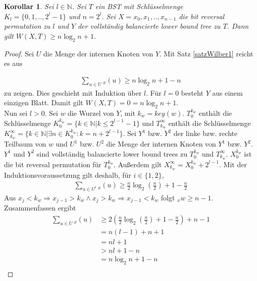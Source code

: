 \documentclass[a4paper,12pt]{article}
\begin{document}
\newtheorem{Korollar1}{Korollar}[section]
\begin{Korollar1} Sei $l \in \mathbb{N}$. Sei $T$ ein BST mit Schlüsselmenge\\ ${K_l = \{0,1,..,2^l -1\}}$ und $n = 2^l$. Sei $X = x_0, x_1,..,x_{n-1}$ die bit reversal permutation zu $l$ und $Y$ der vollständig balancierte lower bound tree zu $T$. Dann gilt  $W\left(X,T\right) \geq n \log_2 n + 1 $. 
\end{Korollar1}
\begin{proof}
Sei $U$ die Menge der internen Knoten von $Y$. Mit Satz \ref{satzWilber1} reicht es aus 

\begin{align*}
\sum_{u \in U} {_x\left(u\right)} \geq n \log_2 n + 1 - n 
\end{align*} 
zu zeigen. Dies geschieht mit Induktion über $l$. Für $l = 0$ besteht $Y$ aus einem einzigen Blatt. Damit gilt $ W\left(X,T\right) = 0 = n \log_2 n + 1 $. \\
Nun sei $l > 0$. Sei $w$ die Wurzel von $Y$, mit $k_w = \mathit{key}(w)$. $T_0^{k_w}$ enthält die Schlüsselmenge $K_0^{k_w} = \{k \in \mathbb{N}\vert k \leq 2^{l-1} - 1\}$ und $T_{k_w}^\infty$ enthält die Schlüsselmenge  $ K^\infty_{k_w} = \{k \in \mathbb{N}\vert \exists n \in K_0^{k_w}\colon  k = n + 2^{l-1}\}$. Sei $Y^1$ bzw. $Y^2$ der linke bzw. rechte Teilbaum von $w$ und $U^1$ bzw. $U^2$ die Menge der internen Knoten von $Y^1$ bzw. $Y^2$. $Y^1$ und $Y^2$ sind vollständig balancierte lower bound trees zu $T_0^{k_w}$ und $T_{k_w}^\infty$. $X^{k_w}_0$ ist die bit reversal permutation für $T_0^{k_w}$. Außerdem gilt $X_{k_w}^\infty = X^{k_w}_0 + 2^{l-1}$. Mit der Induktionsvoraussetzung gilt deshalb, für $i \in \{1,2\}$,
\begin{align*}
\sum_{u \in U^i} {_x\left(u\right)} \geq  \frac{n}{2} \log_2 \left(\frac{n}{2} \right) + 1 - \frac{n}{2}  
\end{align*}
Aus $x_j < k_w \Rightarrow x_{j-1} > k_w  \land x_j > k_w \Rightarrow x_{j-1} < k_w $ folgt $_x{w} \geq n-1$. Zusammenfassen ergibt
\begin{align*}
\sum_{u \in U} {_x\left(u\right)} &\geq 2 \left( \frac{n}{2}  \log_2 \left(\frac{n}{2} \right) + 1 - \frac{n}{2} \right) + n - 1\\	
&= n (l-1) + n + 1 \\
&= n l + 1 \\	
&> n l + 1 -n \\
&= n \log_2 n + 1 - n\\	
\end{align*}
		
\end{proof}
\end{document}
